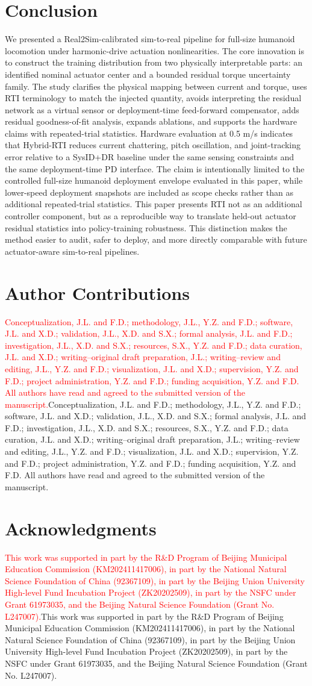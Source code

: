 \documentclass[twoside,final,1p,times]{elsarticle}
\newcommand{\rev}[1]{#1}
\newcommand{\templrev}[1]{\ifmarkedred\textcolor{red}{#1}\else#1\fi}
\begin{document}
\section{Conclusion}
\label{sec:conclusion}
We presented a Real2Sim-calibrated sim-to-real pipeline for full-size humanoid locomotion under harmonic-drive actuation nonlinearities. The core innovation is to construct the training distribution from two physically interpretable parts: an identified nominal actuator center and a bounded residual torque uncertainty family. \rev{The study clarifies the physical mapping between current and torque, uses RTI terminology to match the injected quantity, avoids interpreting the residual network as a virtual sensor or deployment-time feed-forward compensator, adds residual goodness-of-fit analysis, expands ablations, and supports the hardware claims with repeated-trial statistics.} Hardware evaluation at 0.5 m/s indicates that Hybrid-RTI reduces current chattering, pitch oscillation, and joint-tracking error relative to a SysID+DR baseline under the same sensing constraints and the same deployment-time PD interface. The claim is intentionally limited to the controlled full-size humanoid deployment envelope evaluated in this paper, while lower-speed deployment snapshots are included as scope checks rather than as additional repeated-trial statistics. \rev{This paper presents RTI not as an additional controller component, but as a reproducible way to translate held-out actuator residual statistics into policy-training robustness. This distinction makes the method easier to audit, safer to deploy, and more directly comparable with future actuator-aware sim-to-real pipelines.}


\section*{Author Contributions}
\templrev{Conceptualization, J.L. and F.D.; methodology, J.L., Y.Z. and F.D.; software, J.L. and X.D.; validation, J.L., X.D. and S.X.; formal analysis, J.L. and F.D.; investigation, J.L., X.D. and S.X.; resources, S.X., Y.Z. and F.D.; data curation, J.L. and X.D.; writing--original draft preparation, J.L.; writing--review and editing, J.L., Y.Z. and F.D.; visualization, J.L. and X.D.; supervision, Y.Z. and F.D.; project administration, Y.Z. and F.D.; funding acquisition, Y.Z. and F.D. All authors have read and agreed to the submitted version of the manuscript.}

\section*{Acknowledgments}
\templrev{This work was supported in part by the R\&D Program of Beijing Municipal Education Commission (KM202411417006), in part by the National Natural Science Foundation of China (92367109), in part by the Beijing Union University High-level Fund Incubation Project (ZK20202509), in part by the NSFC under Grant 61973035, and the Beijing Natural Science Foundation (Grant No. L247007).}
\end{document}

